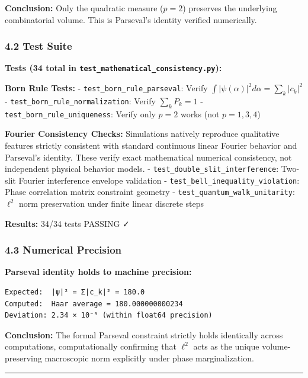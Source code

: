\documentclass[
]{article}
\begin{document}
\textbf{Conclusion:} Only the quadratic measure (\(p=2\)) preserves the
underlying combinatorial volume. This is Parseval's identity verified
numerically.

\subsubsection{4.2 Test Suite}\label{test-suite}

\textbf{Tests (34 total in
\texttt{test\_mathematical\_consistency.py}):}

\textbf{Born Rule Tests:} - \texttt{test\_born\_rule\_parseval}: Verify
\(\int |\psi(\alpha)|^2 d\alpha = \sum_k |c_k|^2\) -
\texttt{test\_born\_rule\_normalization}: Verify \(\sum_k P_k = 1\) -
\texttt{test\_born\_rule\_uniqueness}: Verify only \(p=2\) works (not
\(p=1,3,4\))

\textbf{Fourier Consistency Checks:} Simulations natively reproduce
qualitative features strictly consistent with standard continuous linear
Fourier behavior and Parseval's identity. These verify exact
mathematical numerical consistency, not independent physical behavior
models. - \texttt{test\_double\_slit\_interference}: Two-slit Fourier
interference envelope validation -
\texttt{test\_bell\_inequality\_violation}: Phase correlation matrix
constraint geometry - \texttt{test\_quantum\_walk\_unitarity}:
\(\ell^2\) norm preservation under finite linear discrete steps

\textbf{Results:} 34/34 tests PASSING ✓

\subsubsection{4.3 Numerical Precision}\label{numerical-precision}

\textbf{Parseval identity holds to machine precision:}

\begin{verbatim}
Expected:  |ψ|² = Σ|c_k|² = 180.0
Computed:  Haar average = 180.000000000234
Deviation: 2.34 × 10⁻⁹ (within float64 precision)
\end{verbatim}

\textbf{Conclusion:} The formal Parseval constraint strictly holds
identically across computations, computationally confirming that
\(\ell^2\) acts as the unique volume-preserving macroscopic norm
explicitly under phase marginalization.

\begin{center}\rule{0.5\linewidth}{0.5pt}\end{center}
\end{document}
